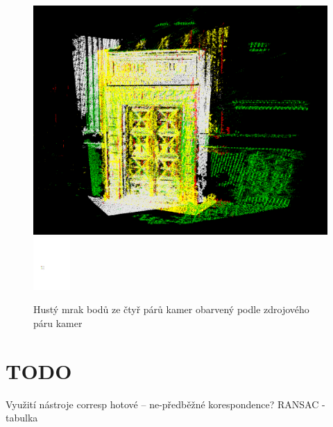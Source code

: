 \documentclass[11pt,oneside,a4paper,pdftex]{article}   %
\begin{document}
			\begin{figure}[htb]
					\centering
						\includegraphics[width=12.8cm]{pictures/points_from_stereo_coloured_by_pair-pairs-01_02-01_05-02_06-03_07.png}
						\hskip 10pt
						\includegraphics[height=2cm]{pictures/points_from_stereo_coloured-legend.pdf}
				\caption{Hustý mrak bodů ze čtyř párů kamer obarvený podle zdrojového páru kamer}
				\label{figPointsFromStereoColouredBySourcePair}
			\end{figure}
	
	
	

\section{TODO}
		Využití nástroje corresp \cite{code_repo}
			hotové -- ne-předběžné korespondence?
		RANSAC - tabulka
\end{document}
